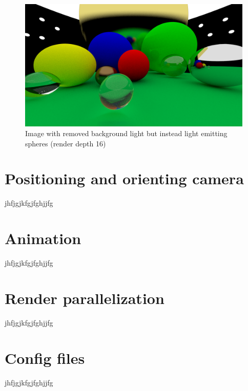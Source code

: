 \documentclass[12pt]{report}
\begin{document}
\begin{figure}[h!]
\includegraphics[width=\textwidth]{step8}
\centering
\caption{Image with removed background light but instead light emitting spheres (render depth 16)}
\label{fig:step8}
\end{figure}

\chapter{Positioning and orienting camera}
jhfjgjkfgjfghjjfg

\chapter{Animation}
jhfjgjkfgjfghjjfg

\chapter{Render parallelization}
jhfjgjkfgjfghjjfg

\chapter{Config files}
jhfjgjkfgjfghjjfg
\end{document}
